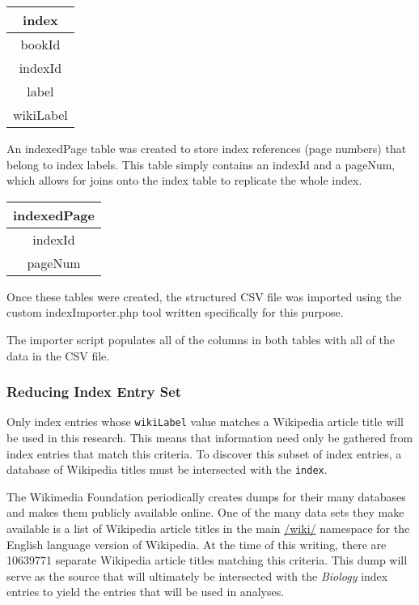 \begin{center}
\begin{tabular}{|c|}
\hline 
\textbf{index} \\ 
\hline 
bookId \\ 
\hline 
indexId \\ 
\hline 
label \\ 
\hline 
wikiLabel \\ 
\hline 
\end{tabular}
\end{center}
 
An indexedPage table was created to store index references (page numbers) that belong to index labels.
This table simply contains an indexId and a pageNum, which allows for joins onto the index table to replicate the whole index.

\begin{center}
\begin{tabular}{|c|}
\hline 
\textbf{indexedPage} \\ 
\hline 
indexId \\ 
\hline 
pageNum \\ 
\hline 
\end{tabular} 
\end{center}

Once these tables were created, the structured CSV file was imported using the custom indexImporter.php tool written specifically for this purpose.

The importer script populates all of the columns in both tables with all of the data in the CSV file.

\subsubsection{Reducing Index Entry Set}
\label{subsec:reducing}

Only index entries whose {\tt wikiLabel} value matches a Wikipedia article title will be used in this research.
This means that information need only be gathered from index entries that match this criteria.
To discover this subset of index entries, a database of Wikipedia titles must be intersected with the {\tt index}.

The Wikimedia Foundation periodically creates dumps for their many databases and makes them publicly available online\cite{wiki-dumps}.
One of the many data sets they make available is a list of Wikipedia article titles in the main \url{/wiki/} namespace for the English language version of Wikipedia\cite{wiki-dump-titles}.
At the time of this writing, there are 10639771 separate Wikipedia article titles matching this criteria.
This dump will serve as the source that will ultimately be intersected with the {\it Biology} index entries to yield the entries that will be used in analyses.

